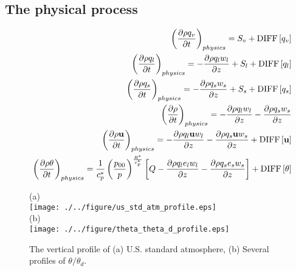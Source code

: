 \subsection{The physical process}
\begin{eqnarray}
&& \left( \frac{\partial \rho q_v}{\partial t} \right)_{physics}  = S_v
+{\rm DIFF}\left[q_v \right]
\label{eq:rho_v_p2}\\
&& \left( \frac{\partial \rho q_l}{\partial t} \right)_{physics}
= - \frac{\partial \rho q_l w_l}{\partial z}+S_l
+{\rm DIFF}\left[q_l \right]
\label{eq:rho_l_p2}\\
&& \left( \frac{\partial \rho q_s}{\partial t} \right)_{physics}
=- \frac{\partial \rho q_s w_s}{\partial z}+S_s
+{\rm DIFF}\left[q_s \right]
\label{eq:rho_s_p2}\\
&& \left( \frac{\partial \rho}{\partial t} \right)_{physics}
=- \frac{\partial \rho q_l w_l}{\partial z}
 - \frac{\partial \rho q_s w_s}{\partial z}
 \label{eq:rhotot_p2}\\
&& \left( \frac{\partial \rho {\bf u}}{\partial t} \right)_{physics}
=
- \frac{\partial \rho q_l {\bf u} w_l}{\partial z}
- \frac{\partial \rho q_s {\bf u} w_s}{\partial z}
+{\rm DIFF}\left[{\bf u} \right]
 \label{eq:momtot_p2}\\
&& \left( \frac{\partial \rho \theta  }{\partial t} \right)_{physics}
=  \frac{1}{c_p^*} \left(\frac{p_{00}}{p}\right)^{\frac{R^*}{c_p^*}}
\left[Q
 - \frac{\partial \rho q_l e_l w_l}{\partial z}
 - \frac{\partial \rho q_s e_s w_s}{\partial z}
\right]
 + {\rm DIFF}\left[\theta \right] \label{eq:etot_p2}
\end{eqnarray}

\begin{figure}[t]
  (a)\\
  \texttt{[image: ./../figure/us\_std\_atm\_profile.eps]}\\
  (b)\\
  \texttt{[image: ./../figure/theta\_theta\_d\_profile.eps]}\\
  \caption{The vertical profile of (a) U.S. standard atmosphere,
  (b) Several profiles of $\theta/\theta_d$.}
  \label{fig:fig1}
\end{figure}
